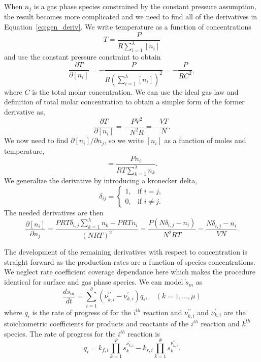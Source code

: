 \documentclass[12pt]{ussci}
\def\surfreactions{\theta}
\def\nspecies{\Psi}
\def\gasspecies{\lambda}
\def\surfspecies{\mu}
\begin{document}
When $n_j$ is a gas phase species constrained by the constant pressure assumption, the result becomes more complicated and we need to find all of the derivatives in Equation~\ref{eq:gen_deriv}.
We write temperature as a function of concentrations
\begin{equation}
    T = \frac{P}{R\sum_{i=1}^{\gasspecies}[n_i]}
\end{equation}
and use the constant pressure constraint to obtain
\begin{equation}
    \frac{\partial T}{\partial [n_i]} = -\frac{P}{R(\sum_{i=1}^{\gasspecies}[n_i])^{2}} = -\frac{P}{RC^{2}},
\end{equation}
where $C$ is the total molar concentration.
We can use the ideal gas law and definition of total molar concentration to obtain a simpler form of the former derivative as,
\begin{equation}
    \frac{\partial T}{\partial [n_i]}  = -\frac{P V^2}{N^2 R} = -\frac{VT}{N}.
\end{equation}
We now need to find $\partial [n_i] / \partial n_j$, so we write $[n_i]$ as a function of moles and temperature,
\begin{equation}
    [n_i] = \frac{P n_i}{R T \sum_{k=1}^{\gasspecies} n_k}.
\end{equation}
We generalize the derivative by introducing a kronecker delta,
\begin{equation}
    \delta_{ij} =
    \begin{cases}
            1, &         \text{if } i=j,\\
            0, &         \text{if } i\neq j.
    \end{cases}
\end{equation}
The needed derivatives are then
\begin{equation}
    \frac{\partial [n_i]}{\partial n_j} = \frac{P R T \delta_{i,j} \sum_{k=1}^{\gasspecies}{n_k} - P R T n_i}{(NRT)^2} = \frac{P(N\delta_{i,j}-n_i)}{N^2RT} = \frac{N\delta_{i,j}-n_i}{V N}.
\end{equation}

The development of the remaining derivatives with respect to concentration is straight forward as the production rates are a function of species concentrations.
We neglect rate coefficient coverage dependance here which makes the procedure identical for surface and gas phase species.
We can model $\dot{s}_{m}$ as
\begin{equation}
        \frac{d s_{m}}{dt} = \sum_{i=1}^{\surfreactions}{(\nu^{\prime\prime}_{k,i}-\nu^{\prime}_{k,i})q_i},\quad(k=1,...,\surfspecies)
\end{equation}
where $q_i$ is the rate of progress of for the $i^{th}$ reaction and $\nu^{\prime\prime}_{k,i}$ and $\nu^{\prime}_{k,i}$ are the stoichiometric coefficients for products and reactants of the $i^{th}$ reaction and $k^{th}$ species.
The rate of progress for the $i^{th}$ reaction is
\begin{equation}
        q_i = k_{f,i}\prod_{k=1}^{\nspecies}{s_k^{\nu^{\prime}_{k,i}}} - k_{r,i}\prod_{k=1}^{\nspecies}{s_k^{\nu^{\prime\prime}_{k,i}}}.
\end{equation}
\end{document}
